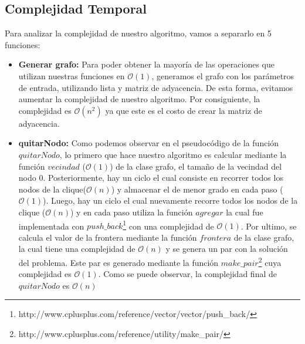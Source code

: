 \subsection{Complejidad Temporal}
Para analizar la complejidad de nuestro algoritmo, vamos a separarlo en 5 funciones:
\begin{itemize}
\item \textbf{Generar grafo:} \newline
Para poder obtener la mayoría de las operaciones que utilizan nuestras funciones en $\mathcal{O}(1)$, generamos el grafo con los parámetros de entrada, utilizando lista y matriz de adyacencia. De esta forma, evitamos aumentar la complejidad de nuestro algoritmo. Por consiguiente, la complejidad es $\mathcal{O}(n^{2})$ ya que este es el costo de crear la matriz de adyacencia.

\item \textbf{quitarNodo:} \newline
Como podemos observar en el pseudocódigo de la función $quitarNodo$, lo primero que hace nuestro algoritmo es calcular mediante la función $vecindad$ ($\mathcal{O}(1)$) de la clase grafo, el tamaño de la vecindad del nodo 0. Posteriormente, hay un ciclo el cual consiste en recorrer todos los nodos de la clique($\mathcal{O}(n)$) y almacenar el de menor grado en cada paso ($\mathcal{O}(1)$).
\newline
Luego, hay un ciclo el cual nuevamente recorre todos los nodos de la clique ($\mathcal{O}(n)$) y en cada paso utiliza la función $agregar$ la cual fue implementada con $push\_back$\footnote{http://www.cplusplus.com/reference/vector/vector/push\_back/} con una complejidad de $\mathcal{O}(1)$.
\newline
Por ultimo, se calcula el valor de la frontera mediante la función $frontera$ de la clase grafo, la cual tiene una complejidad de $\mathcal{O}(n)$ y se genera un par con la solución del problema. Este par es generado mediante la función $make\_pair$\footnote{http://www.cplusplus.com/reference/utility/make\_pair/} cuya complejidad es $\mathcal{O}(1)$.
\newline
Como se puede observar, la complejidad final de $quitarNodo$ es $\mathcal{O}(n)$


\end{itemize}

